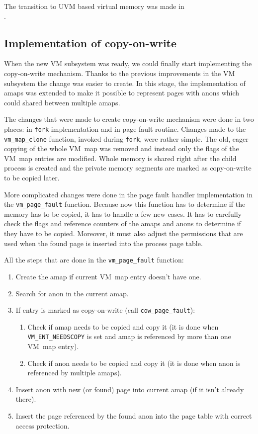 The transition to UVM based virtual memory was made in \\ .

\subsection{Implementation of copy-on-write}

When the new VM subsystem was ready, we could finally start implementing the copy-on-write mechanism.
Thanks to the previous improvements in the VM subsystem the change was easier to create.
In this stage, the implementation of amaps was extended to make it possible to represent pages with anons which could shared between multiple amaps.

The changes that were made to create copy-on-write mechanism were done in two places: in {\tt fork} implementation and in page fault routine.
Changes made to the \texttt{vm_map_clone} function, invoked during {\tt fork}, were rather simple.
The old, eager copying of the whole VM~map was removed and instead only the flags of the VM~map entries are modified.
Whole memory is shared right after the child process is created and the private memory segments are marked as copy-on-write to be copied later.

More complicated changes were done in the page fault handler implementation in the \texttt{vm_page_fault} function.
Because now this function has to determine if the memory has to be copied, it has to handle a few new cases.
It has to carefully check the flags and reference counters of the amaps and anons to determine if they have to be copied.
Moreover, it must also adjust the permissions that are used when the found page is inserted into the process page table.

All the steps that are done in the \texttt{vm_page_fault} function:

\begin{enumerate}
  \item Create the amap if current VM~map entry doesn't have one.
  \item Search for anon in the current amap.
  \item If entry is marked as copy-on-write (call \texttt{cow_page_fault}):
    \begin{enumerate}
      \item Check if amap needs to be copied and copy it
        (it is done when \\ \texttt{VM_ENT_NEEDSCOPY} is set and amap is referenced by more than one VM~map entry).
      \item Check if anon needs to be copied and copy it (it is done when anon is referenced by multiple amaps).
    \end{enumerate}
  \item Insert anon with new (or found) page into current amap (if it isn't already there).
  \item Insert the page referenced by the found anon into the page table with correct access protection.
\end{enumerate}


